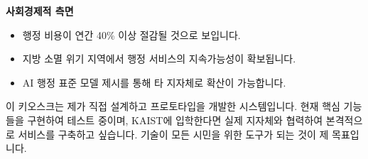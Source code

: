 \textbf{사회경제적 측면}
\begin{itemize}
    \item 행정 비용이 연간 40\% 이상 절감될 것으로 보입니다.
    \item 지방 소멸 위기 지역에서 행정 서비스의 지속가능성이 확보됩니다.
    \item AI 행정 표준 모델 제시를 통해 타 지자체로 확산이 가능합니다.
\end{itemize}

이 키오스크는 제가 직접 설계하고 프로토타입을 개발한 시스템입니다. 현재 핵심 기능들을 구현하여 테스트 중이며, KAIST에 입학한다면 실제 지자체와 협력하여 본격적으로 서비스를 구축하고 싶습니다. 기술이 모든 시민을 위한 도구가 되는 것이 제 목표입니다.